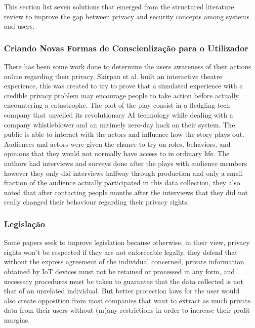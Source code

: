 \documentclass[conference]{IEEEtran}
\begin{document}
\par This section list seven solutions that emerged from the structured
literature review to improve the gap between privacy and security concepts
among systems and users.

\subsubsection{Criando Novas Formas de Conscienlização para o Utilizador}

There has been some work done to determine the users awareness of their
actions online regarding their privacy. Skirpan et al. \cite{SkirpanPrivacy}
built an interactive theatre experience, this was created to try to prove
that a simulated experience with a credible privacy problem may encourage
people to take action before actually encountering a catastrophe. The plot
of the play consist in a fledgling tech company that unveiled its revolutionary
AI technology while dealing with a company whistleblower and an untimely
zero-day hack on their system. The public is able to interact with the actors
and influence how the story plays out. Audiences and actors were given the
chance to try on roles, behaviors, and opinions that they would not normally
have access to in ordinary life. The authors had interviews and surveys
done after the plays with audience members however they only did interviews
halfway through production and only a small fraction of the audience actually
participated in this data collection, they also noted that after contacting
people months after the interviews that they did not really changed their
behaviour regarding their privacy rights.

\subsubsection{Legislação}

Some papers seek to improve legislation \cite{WEBER2015618, FabianoInternet}
because otherwise, in their view, privacy rights won't be respected if they
are not enforceable legally, they defend that without the express agreement
of the individual concerned, private information obtained by IoT devices
must not be retained or processed in any form, and necessary procedures
must be taken to guarantee that the data collected is not that of an unrelated
individual. But better protection laws for the user would also create opposition
from most companies that want to extract as much private data from their
users without (m)any restrictions in order to increase their profit margins.
\end{document}
